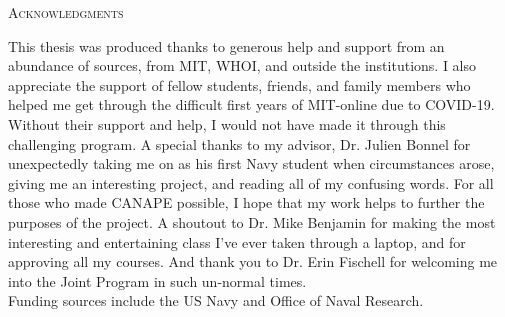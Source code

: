
\noindent
\begin{singlespace}
{\parindent0pt
	{\large \textsc{Acknowledgments}}

	This thesis was produced thanks to generous help and support from an abundance of sources, from MIT, WHOI, and outside the institutions. I also appreciate the support of fellow students, friends, and family members who helped me get through the difficult first years of MIT-online due to COVID-19. Without their support and help, I would not have made it through this challenging program. A special thanks to my advisor, Dr. Julien Bonnel for unexpectedly taking me on as his first Navy student when circumstances arose, giving me an interesting project, and reading all of my confusing words. For all those who made CANAPE possible, I hope that my work helps to further the purposes of the project. A shoutout to Dr. Mike Benjamin for making the most interesting and entertaining class I've ever taken through a laptop, and for approving all my courses. And thank you to Dr. Erin Fischell for welcoming me into the Joint Program in such un-normal times. \\
	Funding sources include the US Navy and Office of Naval Research. 
}

\end{singlespace}

\newpage
\null
\newpage